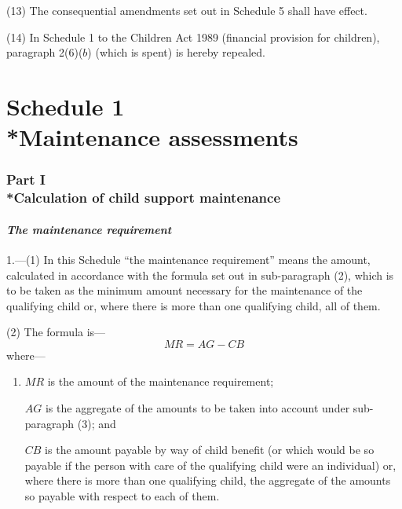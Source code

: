 \documentclass[12pt,a4paper]{article}
\begin{document}
(13) The consequential amendments set out in Schedule 5 shall have effect.

(14) In Schedule 1 to the Children Act 1989 (financial provision for children), paragraph 2(6)($b$)  (which is spent) is hereby repealed.


\bigskip

\small

\part[Schedule 1 --- Maintenance assessments]{Schedule 1\\*Maintenance assessments}

\section[Part I --- Calculation of child support maintenance]{Part I\\*Calculation of child support maintenance}

\renewcommand\parthead{ --- Schedule 1 Part I}

\subsection*{\itshape The maintenance requirement}

1.---(1) In this Schedule “the maintenance requirement” means the amount, calculated in accordance with the formula set out in sub-paragraph (2), which is to be taken as the minimum amount necessary for the maintenance of the qualifying child or, where there is more than one qualifying child, all of them.

(2) The formula is—
\[
MR = AG - CB
\]
where—
\begin{enumerate}\item[]
    $MR$ is the amount of the maintenance requirement;

    $AG$ is the aggregate of the amounts to be taken into account under sub-paragraph (3); and

    $CB$ is the amount payable by way of child benefit (or which would be so payable if the person with care of the qualifying child were an individual) or, where there is more than one qualifying child, the aggregate of the amounts so payable with respect to each of them. 
\end{enumerate}
\end{document}
